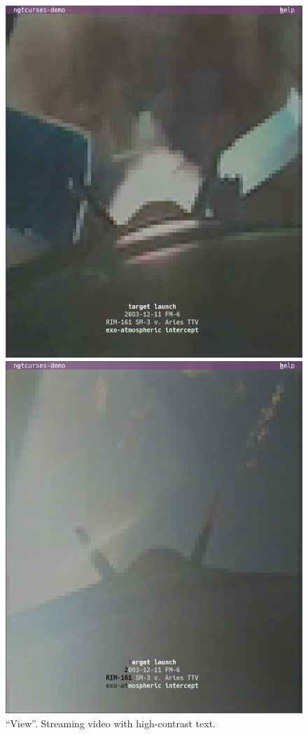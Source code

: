 \documentclass[letterpaper,10pt]{article}
\begin{document}
\begin{figure}
  \centering
  \begin{minipage}{0.45\textwidth}
    \includegraphics[width=1\linewidth]{media/demo-view1.png}
    \caption{``View''. Streaming video with high-contrast text.}
  \end{minipage}\hfill
  \begin{minipage}{0.45\textwidth}
    \includegraphics[width=1\linewidth]{media/demo-view2.png}

\end{minipage}
\end{figure}
\end{document}
